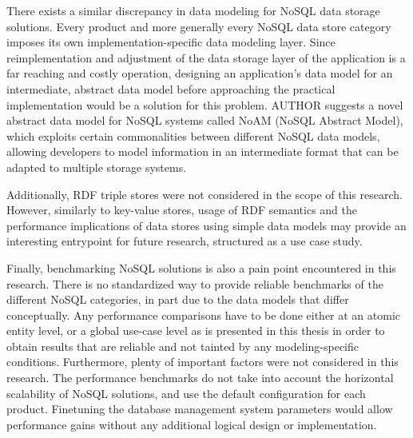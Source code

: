 There exists a similar discrepancy in data modeling for NoSQL data storage solutions.
Every product and more generally every NoSQL data store category imposes its own implementation-specific data modeling layer.
Since reimplementation and adjustment of the data storage layer of the application is a far reaching and costly operation, designing an application's data model for an intermediate, abstract data model before approaching the practical implementation would be a solution for this problem.
AUTHOR suggests a novel abstract data model for NoSQL systems called NoAM (NoSQL Abstract Model), which exploits certain commonalities between different NoSQL data models, allowing developers to model information in an intermediate format that can be adapted to multiple storage systems.

Additionally, RDF triple stores were not considered in the scope of this research.
However, similarly to key-value stores, usage of RDF semantics and the performance implications of data stores using simple data models may provide an interesting entrypoint for future research, structured as a use case study.

Finally, benchmarking NoSQL solutions is also a pain point encountered in this research.
There is no standardized way to provide reliable benchmarks of the different NoSQL categories, in part due to the data models that differ conceptually.
Any performance comparisons have to be done either at an atomic entity level, or a global use-case level as is presented in this thesis in order to obtain results that are reliable and not tainted by any modeling-specific conditions.
Furthermore, plenty of important factors were not considered in this research.
The performance benchmarks do not take into account the horizontal scalability of NoSQL solutions, and use the default configuration for each product.
Finetuning the database management system parameters would allow performance gains without any additional logical design or implementation.
